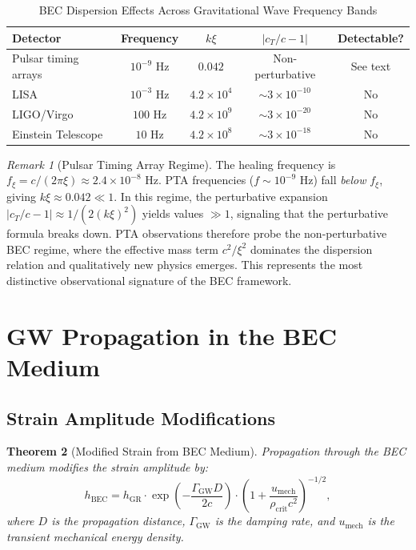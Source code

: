 \documentclass[11pt,a4paper]{article}
\newcommand{\rhocrit}{\ensuremath{\rho_{\mathrm{crit}}}}
\newcommand{\cT}{\ensuremath{c_T}}
\newcommand{\umech}{\ensuremath{u_{\mathrm{mech}}}}
\newtheorem{theorem}{Theorem}[section]
\theoremstyle{definition}
\theoremstyle{remark}
\newtheorem{remark}[theorem]{Remark}
\begin{document}
\begin{table}[H]
\centering
\caption{BEC Dispersion Effects Across Gravitational Wave Frequency Bands}
\label{tab:dispersion}
\begin{tabular}{@{}lcccc@{}}
\toprule
\textbf{Detector} & \textbf{Frequency} & \textbf{$k\xi$} & \textbf{$|\cT/c - 1|$} & \textbf{Detectable?} \\
\midrule
Pulsar timing arrays & $10^{-9}$ Hz & $0.042$ & Non-perturbative & See text \\
LISA & $10^{-3}$ Hz & $4.2 \times 10^{4}$ & $\sim 3 \times 10^{-10}$ & No \\
LIGO/Virgo & $100$ Hz & $4.2 \times 10^{9}$ & $\sim 3 \times 10^{-20}$ & No \\
Einstein Telescope & $10$ Hz & $4.2 \times 10^{8}$ & $\sim 3 \times 10^{-18}$ & No \\
\bottomrule
\end{tabular}
\end{table}

\begin{remark}[Pulsar Timing Array Regime]
The healing frequency is $f_\xi = c/(2\pi\xi) \approx 2.4 \times 10^{-8}$ Hz. PTA frequencies ($f \sim 10^{-9}$ Hz) fall \emph{below} $f_\xi$, giving $k\xi \approx 0.042 \ll 1$. In this regime, the perturbative expansion $|\cT/c - 1| \approx 1/(2(k\xi)^2)$ yields values $\gg 1$, signaling that the perturbative formula breaks down. PTA observations therefore probe the non-perturbative BEC regime, where the effective mass term $c^2/\xi^2$ dominates the dispersion relation and qualitatively new physics emerges. This represents the most distinctive observational signature of the BEC framework.
\end{remark}

\section{GW Propagation in the BEC Medium}
\label{sec:bec_effects}

\subsection{Strain Amplitude Modifications}
\label{sec:strain_amplitude}

\begin{theorem}[Modified Strain from BEC Medium]
\label{thm:strain_modification}
Propagation through the BEC medium modifies the strain amplitude by:
\begin{equation}
\label{eq:strain_modified}
\boxed{h_{\mathrm{BEC}} = h_{\mathrm{GR}} \cdot \exp\left(-\frac{\Gamma_{\mathrm{GW}} D}{2c}\right) \cdot \left(1 + \frac{\umech}{\rhocrit c^2}\right)^{-1/2},}
\end{equation}
where $D$ is the propagation distance, $\Gamma_{\mathrm{GW}}$ is the damping rate, and $\umech$ is the transient mechanical energy density.
\end{theorem}
\end{document}
